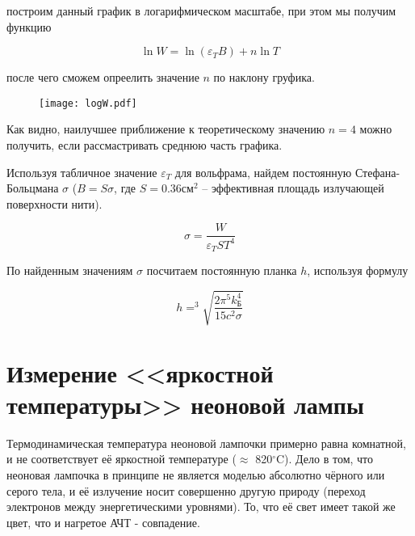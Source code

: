 	построим данный график в логарифмическом масштабе, при этом мы получим функцию

	\begin{equation*}
		\ln W = \ln (\varepsilon_T B) + n \ln T
	\end{equation*}

	после чего сможем опреелить значение $n$ по наклону груфика.

	\begin{figure}[h]
		\centering
		\texttt{[image: logW.pdf]}
		\label{fig:logW}
	\end{figure}

	Как видно, наилучшее приближение к теоретическому значению $n = 4$ можно получить, если рассмастривать среднюю часть графика.

	Используя табличное значение $\varepsilon_T$ для вольфрама, найдем постоянную Стефана-Больцмана $\sigma$ 
	($B = S \sigma$, где $S = 0.36 \text{см}^2$ -- эффективная площадь излучающей поверхности нити). 

	\[\sigma = \frac{W}{\varepsilon_T S T^4} \]

	

	\begin{center}
	\end{center}

	По найденным значениям $\sigma$ посчитаем постоянную планка $h$, используя формулу

	\[ h = ^3\sqrt{\frac{2 \pi^5 k_{\text{Б}}^4}{15 c^2 \sigma}} \]

	\begin{center}
	\end{center}

	\section*{Измерение <<яркостной температуры>> неоновой лампы}

	Термодинамическая температура неоновой лампочки примерно равна комнатной, и не соответствует её яркостной температуре ($\approx$ 820$^{\circ}$C). 
	Дело в том, что неоновая лампочка в принципе не является моделью абсолютно чёрного или серого тела, 
	и её излучение носит совершенно другую природу (переход электронов между энергетическими уровнями). 
	То, что её свет имеет такой же цвет, что и нагретое АЧТ - совпадение.
